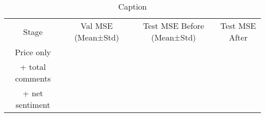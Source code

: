 
\begin{table}
    \centering
    \begin{tabular}{cccc}
         Stage & Val MSE (Mean±Std) & Test MSE Before (Mean±Std) & Test MSE After \\
        Price only  &  &  & \\
        + total comments &  &  & \\
        + net sentiment &  &  & \\
    \end{tabular}
    \caption{Caption}
    \label{tab:results_stages}
\end{table}